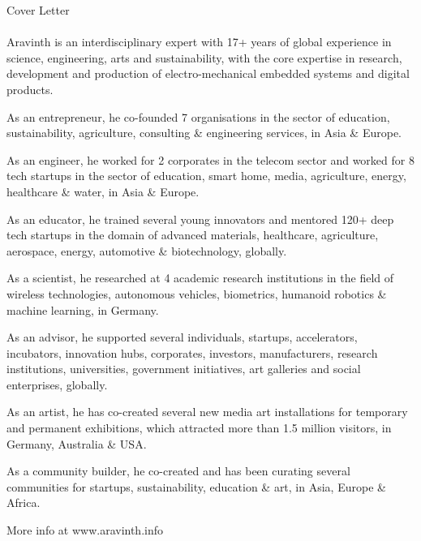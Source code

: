 \clearpage
\pagebreak
{
	\centering
	\Huge Cover Letter
	\par
}

\paragraph{}
Aravinth is an interdisciplinary expert with 17+ years of global experience in science, engineering, arts and sustainability, with the core expertise in research, development and production of electro-mechanical embedded systems and digital products.

As an entrepreneur, he co-founded 7 organisations in the sector of education, sustainability, agriculture, consulting \& engineering services, in Asia \& Europe.

As an engineer, he worked for 2 corporates in the telecom sector and worked for 8 tech startups in the sector of education, smart home, media, agriculture, energy, healthcare \& water, in Asia \& Europe.

As an educator, he trained several young innovators and mentored 120+ deep tech startups in the domain of advanced materials, healthcare, agriculture, aerospace, energy, automotive \& biotechnology, globally.

As a scientist, he researched at 4 academic research institutions in the field of wireless technologies, autonomous vehicles, biometrics, humanoid robotics \& machine learning, in Germany.

As an advisor, he supported several individuals, startups, accelerators, incubators, innovation hubs, corporates, investors, manufacturers, research institutions, universities, government initiatives, art galleries and social enterprises, globally.

As an artist, he has co-created several new media art installations for temporary and permanent exhibitions, which attracted more than 1.5 million visitors, in Germany, Australia \& USA.

As a community builder, he co-created and has been curating several communities for startups, sustainability, education \& art, in Asia, Europe \& Africa.

More info at www.aravinth.info

\clearpage

